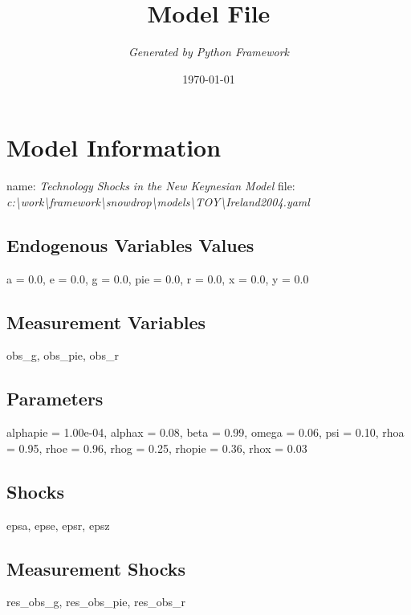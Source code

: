 \documentclass{article}%
\title{\textbf{Model File}}%
\author{\textit{Generated by Python Framework}}%
\date{\today}%
\begin{document}
%
\normalsize%
\maketitle%
\section{Model Information}%
\label{sec:ModelInformation}%
name: %
\textit{Technology Shocks in the New Keynesian Model}%
\newline%
file: %
\textit{c:\textbackslash{}work\textbackslash{}framework\textbackslash{}snowdrop\textbackslash{}models\textbackslash{}TOY\textbackslash{}Ireland2004.yaml}%
\subsection{Endogenous Variables Values}%
\label{subsec:EndogenousVariablesValues}%
a = 0.0, e = 0.0, g = 0.0, pie = 0.0, r = 0.0, x = 0.0, y = 0.0

%
\subsection{Measurement Variables}%
\label{subsec:MeasurementVariables}%
obs\_g, obs\_pie, obs\_r

%
\subsection{Parameters}%
\label{subsec:Parameters}%
alphapie = 1.00e{-}04, alphax = 0.08, beta = 0.99, omega = 0.06, psi = 0.10, rhoa = 0.95, rhoe = 0.96, rhog = 0.25, rhopie = 0.36, rhox = 0.03

%
\subsection{Shocks}%
\label{subsec:Shocks}%
epsa, epse, epsr, epsz

%
\subsection{Measurement Shocks}%
\label{subsec:MeasurementShocks}%
res\_obs\_g, res\_obs\_pie, res\_obs\_r

%
\end{document}
